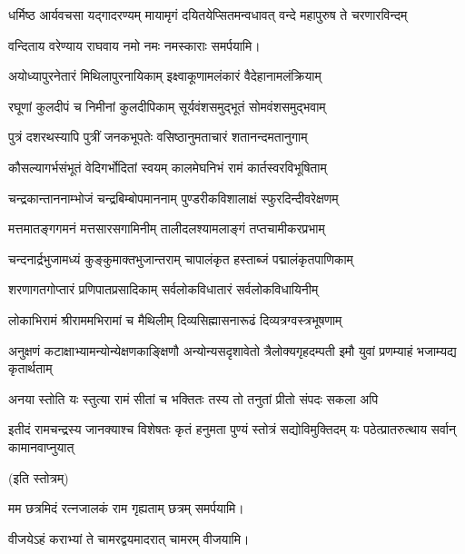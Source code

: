 {धर्मिष्ठ आर्यवचसा यद्गादरण्यम्}
{मायामृगं दयितयेप्सितमन्वधावत्}
{वन्दे महापुरुष ते चरणारविन्दम्}

{वन्दिताय वरेण्याय राघवाय नमो नमः } 
\devAya{} नमस्काराः समर्पयामि।


\twolineshloka
{अयोध्यापुरनेतारं मिथिलापुरनायिकाम्}
{इक्ष्वाकूणामलंकारं वैदेहानामलंक्रियाम्} %

\twolineshloka
{रघूणां कुलदीपं च निमीनां कुलदीपिकाम्}
{सूर्यवंशसमुद्भूतं सोमवंशसमुद्भवाम्} %

\twolineshloka
{पुत्रं दशरथस्यापि पुत्रीं जनकभूपतेः}
{वसिष्ठानुमताचारं शतानन्दमतानुगाम्} %

\twolineshloka
{कौसल्यागर्भसंभूतं वेदिगर्भोदितां स्वयम्}
{कालमेघनिभं रामं कार्तस्वरविभूषिताम्} %

\twolineshloka
{चन्द्रकान्ताननाम्भोजं चन्द्रबिम्बोपमाननाम्}
{पुण्डरीकविशालाक्षं स्फुरदिन्दीवरेक्षणम्} %

\twolineshloka
{मत्तमातङ्गगमनं मत्तसारसगामिनीम्}
{तालीदलश्यामलाङ्गं तप्तचामीकरप्रभाम्} %

\twolineshloka
{चन्दनार्द्रभुजामध्यं कुङ्कुमाक्तभुजान्तराम्}
{चापालंकृत हस्ताब्जं पद्मालंकृतपाणिकाम्} %

\twolineshloka
{शरणागतगोप्तारं प्रणिपातप्रसादिकाम्}
{सर्वलोकविधातारं सर्वलोकविधायिनीम्} %

\twolineshloka
{लोकाभिरामं श्रीराममभिरामां च मैथिलीम्}
{दिव्यसिह्मासनारूढं दिव्यत्रग्वस्त्रभूषणाम्} %

\threelineshloka
{अनुक्षणं कटाक्षाभ्यामन्योन्येक्षणकाङ्क्षिणौ} 
{अन्योन्यसदृशावेतो त्रैलोक्यगृहदम्पती}
{इमौ युवां प्रणम्याहं भजाम्यद्य कृतार्थताम्} %

\twolineshloka
{अनया स्तोति यः स्तुत्या रामं सीतां च भक्तितः}
{तस्य तो तनुतां प्रीतो संपदः सकला अपि} %

\threelineshloka
{इतीदं रामचन्द्रस्य जानक्याश्च विशेषतः}
{कृतं हनुमता पुण्यं स्तोत्रं सद्योविमुक्तिदम्}
{यः पठेत्प्रातरुत्थाय सर्वान् कामानवाप्नुयात्} %

\hfill (इति स्तोत्रम्)



{मम छत्रमिदं रत्नजालकं राम गृह्यताम्}
\hfill छत्रम् समर्पयामि।


{वीजयेऽहं कराभ्यां ते चामरद्वयमादरात्}
\hfill चामरम् वीजयामि।


